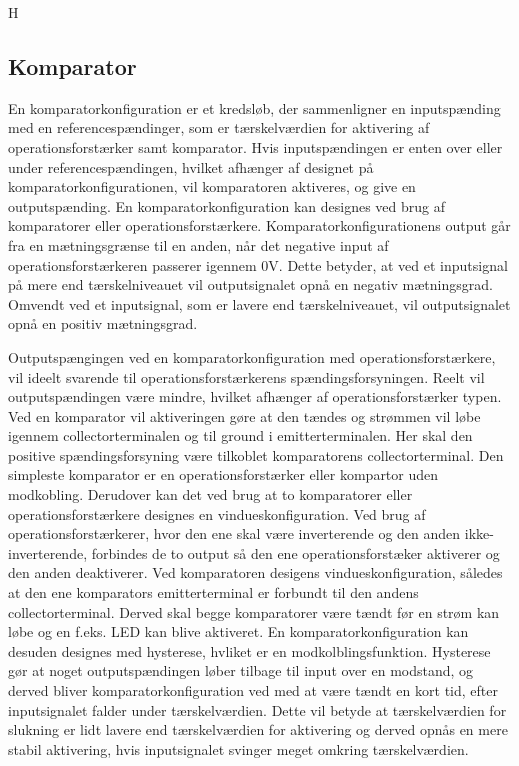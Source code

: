 H%
\subsection{Komparator}\label{Komparatorafsnit}
En komparatorkonfiguration er et kredsløb, der sammenligner en inputspænding  med en referencespændinger, som er tærskelværdien for aktivering af operationsforstærker samt komparator. %
Hvis inputspændingen er enten over eller under referencespændingen, hvilket afhænger af designet på komparatorkonfigurationen, vil komparatoren aktiveres, og give en outputspænding. En komparatorkonfiguration kan designes ved brug af komparatorer eller operationsforstærkere. Komparatorkonfigurationens output går fra en mætningsgrænse til en anden, når det negative input af operationsforstærkeren passerer igennem $0$V. Dette betyder, at ved et inputsignal på mere end tærskelniveauet vil outputsignalet opnå en negativ mætningsgrad. Omvendt ved et inputsignal, som er lavere end tærskelniveauet, vil outputsignalet opnå en positiv mætningsgrad. \cite{webster2009} 

Outputspængingen ved en komparatorkonfiguration med operationsforstærkere, vil ideelt svarende til operationsforstærkerens spændingsforsyningen. Reelt vil outputspændingen være mindre, hvilket afhænger af operationsforstærker typen. Ved en komparator vil aktiveringen gøre at den tændes og strømmen vil løbe igennem collectorterminalen og til ground i emitterterminalen. Her skal den positive spændingsforsyning være tilkoblet komparatorens collectorterminal. Den simpleste komparator er en operationsforstærker eller kompartor uden modkobling. Derudover kan det ved brug at to komparatorer eller operationsforstærkere designes en vindueskonfiguration. Ved brug af operationsforstærkerer, hvor den ene skal være inverterende og den anden ikke-inverterende,  forbindes de to output så den ene operationsforstæker aktiverer og den anden deaktiverer. Ved komparatoren desigens vindueskonfiguration, således at den ene komparators emitterterminal er forbundt til den andens collectorterminal. Derved skal begge komparatorer være tændt før en strøm kan løbe og en f.eks. LED kan blive aktiveret. En komparatorkonfiguration kan desuden designes med hysterese, hvliket er en modkolblingsfunktion. Hysterese gør at noget outputspændingen løber tilbage til input over en modstand, og derved bliver komparatorkonfiguration ved med at være tændt en kort tid, efter inputsignalet falder under tærskelværdien. Dette vil betyde at tærskelværdien for slukning er lidt lavere end tærskelværdien for aktivering og derved opnås en mere stabil aktivering, hvis inputsignalet svinger meget omkring tærskelværdien. \cite{webster2009, Storr2015} \\
  


